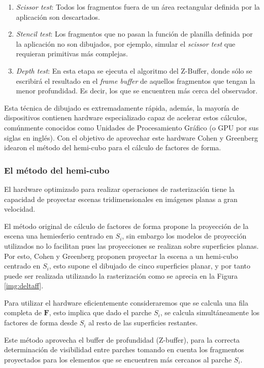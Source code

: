 \begin{enumerate}
\begin{enumerate}
			\item \textit{Scissor test}: Todos los fragmentos fuera de un área rectangular definida por la aplicación son descartados.
			\item \textit{Stencil test}: Los fragmentos que no pasan la función de planilla definida por la aplicación no son dibujados, por ejemplo, simular el \textit{scissor test} que requieran primitivas más complejas.
			\item \textit{Depth test}: En esta etapa se ejecuta el algoritmo del Z-Buffer, donde sólo se escribirá el resultado en el \textit{frame buffer} de aquellos fragmentos que tengan la menor profundidad. Es decir, los que se encuentren más cerca del observador.
		\end{enumerate}
\end{enumerate}

Esta técnica de dibujado es extremadamente rápida, además, la mayoría de dispositivos contienen hardware especializado capaz de acelerar estos cálculos, comúnmente conocidos como Unidades de Procesamiento Gráfico (o GPU por sus siglas en inglés). Con el objetivo de aprovechar este hardware Cohen y Greenberg \cite{Cohen} idearon el método del hemi-cubo para el cálculo de factores de forma.

\subsubsection{El método del hemi-cubo}

El hardware optimizado para realizar operaciones de rasterización tiene la capacidad de proyectar escenas tridimensionales en imágenes planas a gran velocidad. 

El método original de cálculo de factores de forma propone la proyección de la escena una hemiesferio centrado en $S_{i}$, sin embargo los modelos de proyección utilizados no lo facilitan pues las proyecciones se realizan sobre superficies planas. Por esto, Cohen y Greenberg \cite{Cohen} proponen proyectar la escena a un hemi-cubo centrado en $S_{i}$, esto supone el dibujado de cinco superficies planar, y por tanto puede ser realizada utilizando la rasterización como se aprecia en la Figura \ref{img:deltaff}.

Para utilizar el hardware eficientemente consideraremos que se calcula una fila completa de $\mathbf{F}$, esto implica que dado el parche $S_{i}$, se calcula simultáneamente los factores de forma desde $S_{i}$ al resto de las superficies restantes. 

Este método aprovecha el buffer de profundidad (Z-buffer), para la correcta determinación de visibilidad entre parches tomando en cuenta los fragmentos proyectados para los elementos que se encuentren más cercanos al parche $S_{i}$.

